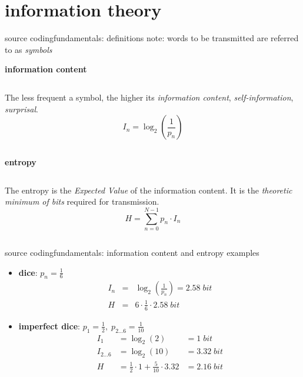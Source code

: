 \section{information theory}
	\begin{frame}{source coding}{fundamentals: definitions}
		note: words to be transmitted are referred to as \textit{symbols}
		\pause
		\begin{block}{\textbf{information content}}
			\begin{columns}
			The less frequent a symbol, the higher its \textit{information content}, \textit{self-information}, \textit{surprisal}.
			\begin{equation*}
				I_n = \log_2\left(\frac{1}{p_n} \right)
			\end{equation*}
            \end{columns}
		\end{block}
		\pause
        \bigskip
		\begin{block}{\textbf{entropy}}
			\begin{columns}
			The entropy is the \textit{Expected Value} of the information content. It is the \textit{theoretic minimum of bits} required for transmission.
			\begin{equation*}
				H = \sum\limits_{n=0}^{N-1}{p_n\cdot I_n}
			\end{equation*}
            \end{columns}
			
		\end{block}
	\end{frame}

	\begin{frame}{source coding}{fundamentals: information content and entropy examples}
		\begin{itemize}
			\item	\textbf{dice}: $p_n = \frac{1}{6}$
			\begin{eqnarray*}
				I_n &=& \log_2\left(\frac{1}{p_n}\right)  = 2.58\; bit\\
				H &=& 6 \cdot \frac{1}{6} \cdot 2.58\; bit %
			\end{eqnarray*}
			\pause
			\item	\textbf{imperfect dice}: $p_1 = \frac{1}{2},\; p_{2\ldots 6} = \frac{1}{10}$
			\pause
			\begin{eqnarray*}
				I_1 &=  \log_2\left(2\right)  &= 1\; bit \\
				I_{2\ldots 6} &= \log_2\left(10\right)  &= 3.32\; bit \\
				H &= \frac{1}{2}\cdot 1 + \frac{5}{10}\cdot 3.32 &= 2.16\; bit %
			\end{eqnarray*}
		\end{itemize}
	\end{frame}

